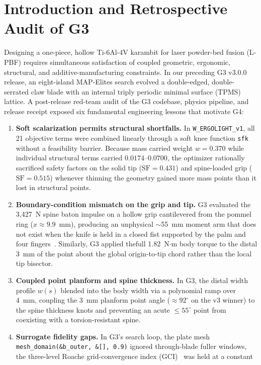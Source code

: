 \documentclass[10pt,journal,letterpaper]{IEEEtran}
\DeclareRobustCommand{\code}[1]{\texorpdfstring{{\nolinkurl{#1}}}{#1}}
\begin{document}
\section{Introduction and Retrospective Audit of G3}\label{sec:intro}
Designing a one-piece, hollow Ti-6Al-4V karambit for laser powder-bed fusion (L-PBF) requires simultaneous satisfaction of
coupled geometric, ergonomic, structural, and additive-manufacturing constraints. In our preceding G3 v3.0.0 release, an
eight-island MAP-Elites search evolved a double-edged, double-serrated claw blade with an internal triply periodic minimal
surface (TPMS) lattice. A post-release red-team audit of the G3 codebase, physics pipeline, and release receipt exposed six
fundamental engineering lessons that motivate G4:
\begin{enumerate}
\item \textbf{Soft scalarization permits structural shortfalls.} In \code{W\_ERGOLIGHT\_v1}, all 21 objective terms were combined
linearly through a soft knee function \code{sfk} without a feasibility barrier. Because mass carried weight $w = 0.370$ while
individual structural terms carried $0.0174$--$0.0700$, the optimizer rationally sacrificed safety factors on the solid tip
($\mathrm{SF} = 0.431$) and spine-loaded grip ($\mathrm{SF} = 0.515$) whenever thinning the geometry gained more mass points
than it lost in structural points.
\item \textbf{Boundary-condition mismatch on the grip and tip.} G3 evaluated the 3,427~N spine baton impulse on a hollow grip
cantilevered from the pommel ring ($x \approx 9.9$~mm), producing an unphysical $\sim$55~mm moment arm that does not exist when
the knife is held in a closed fist supported by the palm and four fingers~\cite{pheasant2006,garrett1971}. Similarly, G3 applied
thefull 1.82~N$\cdot$m body torque to the distal 3~mm of the point about the global origin-to-tip chord rather than the local
tip bisector.
\item \textbf{Coupled point planform and spine thickness.} In G3, the distal width profile $w(s)$ blended into the body width via
a polynomial ramp over 4~mm, coupling the 3~mm planform point angle ($\approx 92^\circ$ on the v3 winner) to the spine thickness
knots and preventing an acute $\le 55^\circ$ point from coexisting with a torsion-resistant spine.
\item \textbf{Surrogate fidelity gaps.} In G3's search loop, the plate mesh \code{mesh\_domain(\&b\_outer, \&[], 0.9)} ignored
through-blade fuller windows, the three-level Roache grid-convergence index (GCI)~\cite{roache1998} was held at a constant

\end{enumerate}
\end{document}
